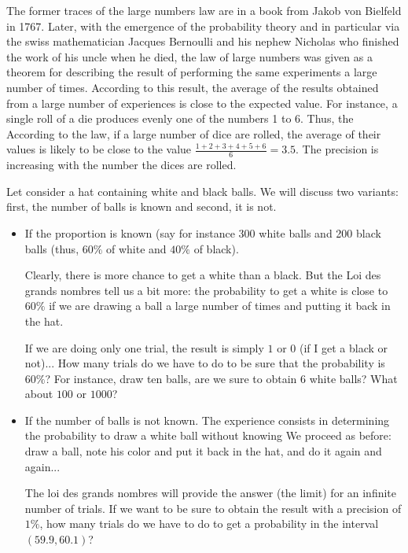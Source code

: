 The former traces of the large numbers law are in a book from Jakob von Bielfeld in 1767.
Later, with the emergence of the probability theory and in particular via the swiss mathematician Jacques Bernoulli
and his nephew Nicholas who finished the work of his uncle when he died, 
the law of large numbers was given as a theorem for describing the result of performing the same experiments
 a large number of times. 
 According to this result, the average of the results obtained from a large number of experiences is close 
 to the expected value. 
For instance, a single roll of a die produces evenly one of the numbers 1 to 6.
Thus, the According to the law, if a large number of dice are rolled, the average of their values 
is likely to be close to the value $\frac{1+2+3+4+5+6}{6}=3.5$.
The precision is increasing with the number the dices are rolled. 

\bigskip

Let consider a hat containing white and black balls.
We will discuss two variants: first, the number of balls is known and second, it is not.

\begin{itemize}
\item If the proportion is known (say for instance 300 white balls and 200 black balls
(thus, $60\%$ of white and $40\%$ of black).

Clearly, there is more chance to get a white than a black.
But the Loi des grands nombres tell us a bit more: the probability to get a white is close to $60\%$
if we are drawing a ball a large number of times and putting it back in the hat.

If we are doing only one trial, the result is simply $1$ or $0$ (if I get a black or not)...
How many trials do we have to do to be sure that the probability is $60\%$?
For instance, draw ten balls, are we sure to obtain $6$ white balls? What about $100$ or $1000$?
\item If the number of balls is not known.
The experience consists in determining the probability to draw a white ball without knowing 
We proceed as before:
draw a ball, note his color and put it back in the hat, and do it again and again...

The loi des grands nombres will provide the answer (the limit) for an infinite number of trials.
If we want to be sure to obtain the result with a precision of $1\%$,
how many trials do we have to do to get a probability in the interval $(59.9,60.1)$?
\end{itemize}

